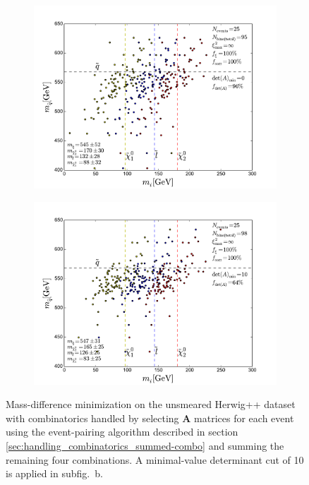 \documentclass[twoside,english]{uiofysmaster}
\begin{document}
\begin{figure}[hbt]
	\centering
	\begin{subfigure}[b]{0.6\textwidth}
		\includegraphics[width=\textwidth]{figures/improving_combinatorics/herwigpp_nosmear_nodetAcut_A_matrix_algorithm_4combosum_TMP.pdf} 
		\caption{ }
		\label{fig:event-pair-A-selection_4combosum_a}
	\end{subfigure}

	\begin{subfigure}[b]{0.6\textwidth}
		\includegraphics[width=\textwidth]{figures/improving_combinatorics/herwigpp_nosmear_detAcut10_A_matrix_algorithm_4combosum_TMP.pdf}
		\caption{ }
		\label{fig:event-pair-A-selection_4combosum_b} 
	\end{subfigure}
	\caption{Mass-difference minimization on the unsmeared Herwig++ dataset with combinatorics handled by selecting $\mathbf{A}$ matrices for each event using the event-pairing algorithm described in section \ref{sec:handling_combinatorics_summed-combo} and summing the remaining four combinations. A minimal-value determinant cut of 10 is applied in subfig.\ b.}
	\label{fig:event-pair-A-selection_4combosum}
\end{figure}
\end{document}
